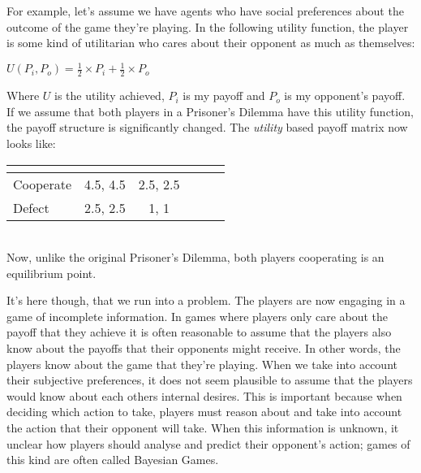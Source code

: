 \documentclass[11pt]{article}
\newcommand*{\np}{\par\noindent\newline}
\begin{document}
\np For example, let's assume we have agents who have social preferences about the outcome of the game they're playing.
In the following utility function, the player is some kind of utilitarian who cares about their opponent as much as themselves:
\begin{center}
	\(U(P_i, P_o) = \frac{1}{2} \times P_i + \frac{1}{2} \times P_o\) 
\end{center}
Where $U$ is the utility achieved, $P_i$ is my payoff and $P_o$ is my opponent's payoff.
If we assume that both players in a Prisoner's Dilemma have this utility function, the payoff structure is significantly
changed. The \textit{utility} based payoff matrix now looks like:
\newline
\begin{center}
	\begin{tabular}{|l||*{5}{c|}}\hline
		\label{utility_prisoner}
		\backslashbox{Prisoner A}{Prisoner B}
		&\makebox[7em]{Cooperate}&\makebox[7em]{Defect}\\\hline\hline
		Cooperate & 4.5, 4.5 & 2.5, 2.5\\\hline
		Defect & 2.5, 2.5 & 1, 1 \\\hline
	\end{tabular}
\end{center}\mbox{}\\
Now, unlike the original Prisoner's Dilemma, both players cooperating is an equilibrium point.

\np It's here though, that we run into a problem. The players are now engaging in a game of incomplete information.
In games where players only care about the payoff that they achieve it is often reasonable to assume that the players
also know about the payoffs that their opponents might receive. In other words, the players know about the game that
they're playing. When we take into account their subjective preferences, it does not seem plausible to assume that the
players would know about each others internal desires. This is important because when deciding which action to take,
players must reason about and take into account the action that their opponent will take. When this information is
unknown, it unclear how players should analyse and predict their opponent's action; games of this kind are often called Bayesian Games.
\end{document}

